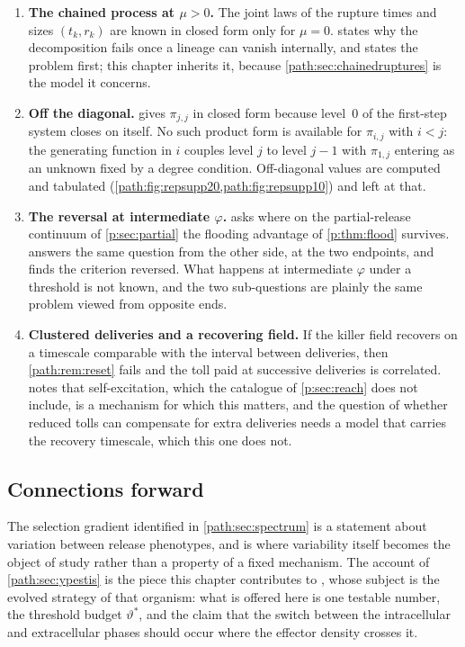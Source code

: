 \begin{enumerate}[leftmargin=1.6em,itemsep=0.25em]
\item \textbf{The chained process at $\mu>0$.} The joint laws of the rupture
times and sizes $(t_k,r_k)$ are known in closed form only for $\mu=0$.
 states why the decomposition fails once a
lineage can vanish internally, and states the problem first; this chapter
inherits it, because \cref{path:sec:chainedruptures} is the model it
concerns.
\item \textbf{Off the diagonal.}  gives
$\pi_{j,j}$ in closed form because level~0 of the first-step system closes
on itself. No such product form is available for $\pi_{i,j}$ with $i<j$: the
generating function in $i$ couples level $j$ to level $j-1$ with $\pi_{1,j}$
entering as an unknown fixed by a degree condition. Off-diagonal values are
computed and tabulated (\cref{path:fig:repsupp20,path:fig:repsupp10}) and
left at that.
\item \textbf{The reversal at intermediate $\varphi$.}
 asks where on the partial-release continuum of
\cref{p:sec:partial} the flooding advantage of \cref{p:thm:flood} survives.
 answers the same question from the other side, at
the two endpoints, and finds the criterion reversed. What happens at
intermediate $\varphi$ under a threshold is not known, and the two
sub-questions are plainly the same problem viewed from opposite ends.
\item \textbf{Clustered deliveries and a recovering field.} If the killer
field recovers on a timescale comparable with the interval between
deliveries, then \cref{path:rem:reset} fails and the toll paid at successive
deliveries is correlated.  notes that
self-excitation, which the catalogue of \cref{p:sec:reach} does not include,
is a mechanism for which this
matters, and the question of whether reduced tolls can compensate for extra
deliveries needs a model that carries the recovery timescale, which this one
does not.
\end{enumerate}

\subsection{Connections forward}
\label{path:sec:forward}

The selection gradient identified in \cref{path:sec:spectrum} is a
statement about variation between release phenotypes, and \ChEvo{} is where
variability itself becomes the object of study rather than a property of a
fixed mechanism. The \yp{} account of \cref{path:sec:ypestis} is the piece
this chapter contributes to , whose
subject is the evolved strategy of that organism: what is offered here is
one testable number, the threshold budget $\vartheta^{\ast}$, and the claim
that the switch between the intracellular and extracellular phases should
occur where the effector density crosses it.

\FloatBarrier
